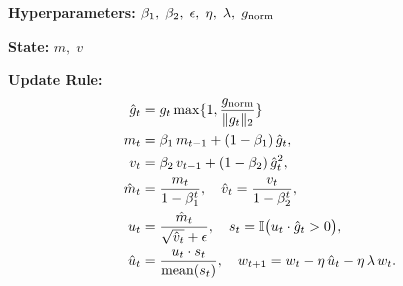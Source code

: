 \begin{algorithm}[H]
  \caption{Cautious}
  \label{alg:cautious}
  \begin{tcolorbox}
  \textbf{Hyperparameters:} $\beta_1,\;\beta_2,\;\epsilon,\;\eta,\;\lambda,\;g_{\mathrm{norm}}$

  \textbf{State:} $m,\;v$

  \textbf{Update Rule:}
  \begin{align*}
  \hat g_t &= g_t \max\{1, \frac{g_{\mathrm{norm}}}{\|g_t\|_2}\} \\
  m_t &= \beta_1\,m_{t-1} + (1-\beta_1)\,\hat g_t,\\
  v_t &= \beta_2\,v_{t-1} + (1-\beta_2)\,\hat g_t^2,\\
  \hat m_t &= \frac{m_t}{1-\beta_1^t},\quad
  \hat v_t = \frac{v_t}{1-\beta_2^t},\\
  u_t &= \frac{\hat m_t}{\sqrt{\hat v_t} + \epsilon},\quad
  s_t = \mathbb{I}\bigl(u_t\cdot \hat g_t > 0\bigr),\\
  \hat u_t &= \frac{u_t \cdot s_t}{\mathrm{mean}(s_t)},\quad
  w_{t+1} = w_t - \eta\,\hat u_t - \eta\,\lambda\,w_t.
  \end{align*}
  \end{tcolorbox}
\end{algorithm}





